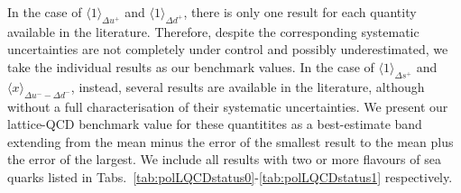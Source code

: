 In the case of $\langle 1 \rangle_{\Delta u^+}$ and $\langle 1 \rangle_{\Delta d^+}$,
there is only one result for each quantity available in the literature.
%
Therefore, despite the corresponding systematic uncertainties are not 
completely under control and possibly underestimated, we take the individual 
results as our benchmark values.
%
In the case of $\langle 1 \rangle_{\Delta s^+}$ and 
$\langle x \rangle_{\Delta u^- - \Delta d^-}$, instead, several results are available
in the literature, although without a full characterisation of
their systematic uncertainties.
%
We present our lattice-QCD benchmark value for these quantitites as
a best-estimate band extending from the mean minus the error of the 
smallest result to the mean plus the error of the largest. 
%
We include all results with two or more flavours of sea quarks listed in 
Tabs.~\ref{tab:polLQCDstatus0}-\ref{tab:polLQCDstatus1} respectively.


